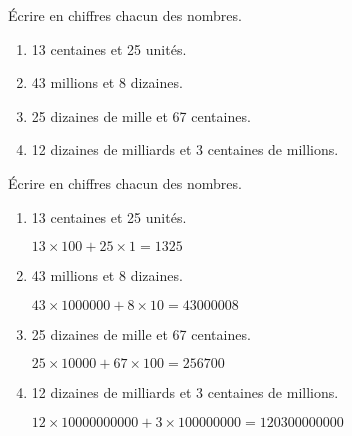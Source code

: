 \begin{exercice}
    Écrire en chiffres chacun des nombres.
    \begin{enumerate}
       \item 13 centaines et 25 unités.
       \item 43 millions et 8 dizaines.
       \item 25 dizaines de mille et 67 centaines.
       \item 12 dizaines de milliards et 3 centaines de millions.
    \end{enumerate}
 \end{exercice}

 \begin{corrige}
    Écrire en chiffres chacun des nombres.

    \begin{enumerate}
       \item 13 centaines et 25 unités.
       
       {\red $13\times 100 + 25\times 1 = \num{1325}$}
       \item 43 millions et 8 dizaines.
       
       {\red $43\times \num{1000000} + 8 \times 10 = \num{43000008}$}
       \item 25 dizaines de mille et 67 centaines.
       
       {\red $25\times \num{10000} + 67\times 100 = \num{256700}$}
       \item 12 dizaines de milliards et 3 centaines de millions.
       
       {\red $12\times \num{10000000000} + 3\times \num{100000000} = \num{120 300 000 000}$}
    \end{enumerate}
 \end{corrige}